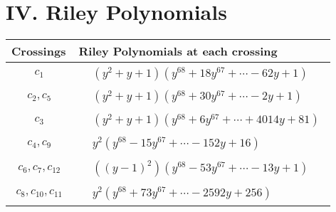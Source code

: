 \documentclass[1p]{elsarticle_modified}
\theoremstyle{definition}
\begin{document}
\centering \section*{ IV. Riley Polynomials}
\begin{tabular}{m{50pt}|m{274pt}}
Crossings & \hspace{64pt}Riley Polynomials at each crossing \\
\hline $$\begin{aligned}c_{1}\end{aligned}$$&$\begin{aligned}
&(y^2+y+1)(y^{68}+18 y^{67}+\cdots-62 y+1)
\end{aligned}$\\
\hline $$\begin{aligned}c_{2},c_{5}\end{aligned}$$&$\begin{aligned}
&(y^2+y+1)(y^{68}+30 y^{67}+\cdots-2 y+1)
\end{aligned}$\\
\hline $$\begin{aligned}c_{3}\end{aligned}$$&$\begin{aligned}
&(y^2+y+1)(y^{68}+6 y^{67}+\cdots+4014 y+81)
\end{aligned}$\\
\hline $$\begin{aligned}c_{4},c_{9}\end{aligned}$$&$\begin{aligned}
&y^2(y^{68}-15 y^{67}+\cdots-152 y+16)
\end{aligned}$\\
\hline $$\begin{aligned}c_{6},c_{7},c_{12}\end{aligned}$$&$\begin{aligned}
&((y-1)^2)(y^{68}-53 y^{67}+\cdots-13 y+1)
\end{aligned}$\\
\hline $$\begin{aligned}c_{8},c_{10},c_{11}\end{aligned}$$&$\begin{aligned}
&y^2(y^{68}+73 y^{67}+\cdots-2592 y+256)
\end{aligned}$\\
\hline
\end{tabular}
\vskip 2pc
\end{document}
